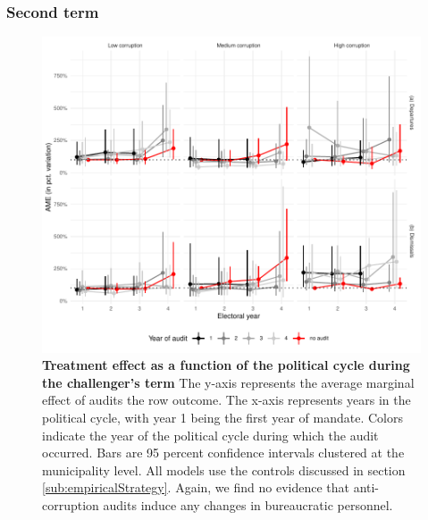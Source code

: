 {\subsubsection*{Second term}

\begin{figure}[H]
    \centering
    \includegraphics{chapters/chapter_2/figures/AMEpolitical_term2Client.pdf}
    \caption{{\bf Treatment effect as a function of the political cycle during the challenger's term} The y-axis represents the average marginal effect of audits the row outcome. The x-axis represents years in the political cycle, with year 1 being the first year of mandate. Colors indicate the year of the political cycle during which the audit occurred. Bars are 95 percent confidence intervals clustered at the municipality level. All models use the controls discussed in section \ref{sub:empiricalStrategy}. Again, we find no evidence that anti-corruption audits induce any changes in bureaucratic personnel.}
    \label{fig:AMEpolitical2}
\end{figure}

}
